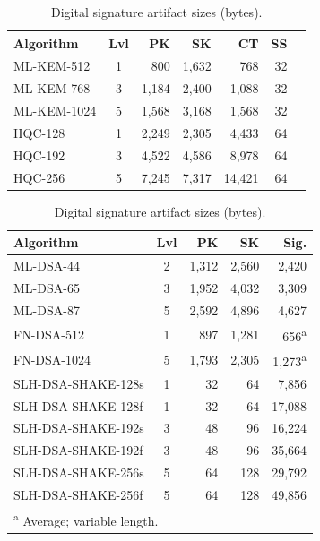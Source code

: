 \documentclass[12pt]{article}
\begin{document}
\begin{table}[!htbp]
\centering
\begin{minipage}[t]{0.48\linewidth}
  \centering
  \caption{KEM artifact sizes (bytes).}
  \label{tab:kem-tamanho}
  \scriptsize
  \begin{tabular}{lcrrrrr}
  \toprule
  \textbf{Algorithm} & \textbf{Lvl} & \textbf{PK} & \textbf{SK} & \textbf{CT} & \textbf{SS} \\
  \midrule
  ML-KEM-512  & 1 &    800 &  1,632 &    768 & 32 \\
  ML-KEM-768  & 3 &  1,184 &  2,400 &  1,088 & 32 \\
  ML-KEM-1024 & 5 &  1,568 &  3,168 &  1,568 & 32 \\
  \midrule
  HQC-128  & 1 &  2,249 &  2,305 &  4,433 & 64 \\
  HQC-192  & 3 &  4,522 &  4,586 &  8,978 & 64 \\
  HQC-256  & 5 &  7,245 &  7,317 & 14,421 & 64 \\
  \bottomrule
  \end{tabular}
\end{minipage}
\hfill
\begin{minipage}[t]{0.48\linewidth}
  \centering
  \caption{Digital signature artifact sizes (bytes).}
  \label{tab:sig-tamanho}
  \scriptsize
  \begin{tabular}{lcrrr}
  \toprule
  \textbf{Algorithm} & \textbf{Lvl} & \textbf{PK} & \textbf{SK} & \textbf{Sig.} \\
  \midrule
  ML-DSA-44 & 2 &  1,312 &  2,560 &  2,420 \\
  ML-DSA-65 & 3 &  1,952 &  4,032 &  3,309 \\
  ML-DSA-87 & 5 &  2,592 &  4,896 &  4,627 \\
  \midrule
  FN-DSA-512  & 1 &   897 &  1,281 &   656\textsuperscript{a} \\
  FN-DSA-1024 & 5 & 1,793 &  2,305 & 1,273\textsuperscript{a} \\
  \midrule
  SLH-DSA-SHAKE-128s & 1 &  32 &   64 &  7,856 \\
  SLH-DSA-SHAKE-128f & 1 &  32 &   64 & 17,088 \\
  SLH-DSA-SHAKE-192s & 3 &  48 &   96 & 16,224 \\
  SLH-DSA-SHAKE-192f & 3 &  48 &   96 & 35,664 \\
  SLH-DSA-SHAKE-256s & 5 &  64 &  128 & 29,792 \\
  SLH-DSA-SHAKE-256f & 5 &  64 &  128 & 49,856 \\
  \bottomrule
  \multicolumn{5}{l}{\footnotesize\textsuperscript{a} Average; variable length.}
  \end{tabular}
\end{minipage}
\end{table}
\end{document}
